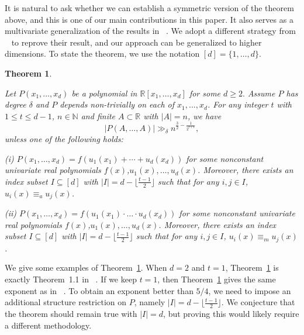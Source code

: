 \documentclass[12pt,reqno]{amsart}
\numberwithin{equation}{section}
\newtheorem{theorem}{Theorem}[section]
\begin{document}
It is natural to ask whether we can establish a symmetric version of the theorem above, and this is one of our main contributions in this paper. It also serves as a multivariate generalization of the results in ~\cite{jing2022semialgebraic}. We adopt a different strategy from ~\cite{jing2022semialgebraic} to reprove their result, and our approach can be generalized to higher dimensions. To state the theorem, we use the notation $[d]=\{1,\ldots,d\}$.

\begin{theorem}\label{thm:main1} 

Let $P(x_{1},\ldots,x_{d})$ be a polynomial in $ \mathbb{R}[x_{1},\ldots,x_{d}]$  for some $d\geq 2.$ Assume $P$ has degree $ \delta $ and $P$ depends non-trivially on each of $x_1,...,x_d$.  For any integer $t$ with $1\leq t\leq d-1$, $n \in \mathbb{N}$ and finite $A\subset \mathbb{R}$ with $|A|=n$, we have
$$
| P(A,\ldots, A)|\gg_{\delta} n^{\frac{3}{2}-\frac{1}{2^{t+1}}},
$$
unless one of the following holds:

(i) $P(x_{1},\ldots,x_{d})=f( u_{1}(x_{1})+\cdots +u_{d}(x_{d}))$ for some nonconstant univariate real polynomials  $f(x)$,$u_1(x),\ldots,u_{d}(x)$. 
Moreover, there exists an index subset $I\subseteq [d]$ with $|I|=d-\lfloor \frac{t-1}{2} \rfloor$ such that for any $i,j\in I$,  $u_{i}(x)\equiv_{a} u_{j}(x)$.



(ii) $P(x_{1},\ldots,x_{d})=f( u_{1}(x_{1})\cdot\ldots\cdot u_{d}(x_{d}))$ for some nonconstant univariate real polynomials  $f(x)$,$u_1(x),\ldots,u_{d}(x)$. Moreover, there exists an index subset $I\subseteq [d]$ with $|I|=d-\lfloor \frac{t-1}{2} \rfloor$ such that for any $i,j\in I$, $u_{i}(x)\equiv_{m} u_{j}(x)$.




\end{theorem}

We give some examples of Theorem~\ref{thm:main1}. 
When $d=2$ and $t=1$, Theorem~\ref{thm:main1} is exactly Theorem~1.1 in ~\cite{jing2022semialgebraic}. 
If we keep $t=1$, then Theorem~\ref{thm:main1} gives the same exponent as in ~\cite{jing2022semialgebraic}. 
To obtain an exponent better than $5/4$, we need to impose an additional structure restriction on $P$, namely $|I|=d-\lfloor \frac{t-1}{2}\rfloor$. 
We conjecture that the theorem should remain true with $|I|=d$, but proving this would likely require a different methodology.
\end{document}

